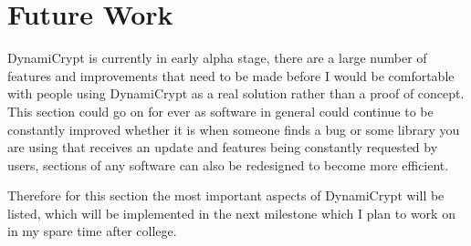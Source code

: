 \section{Future Work}
DynamiCrypt is currently in early alpha stage, there are a large number of features and improvements that need to be made before I would be comfortable with people using DynamiCrypt as a real solution rather than a proof of concept. This section could go on for ever as software in general could continue to be constantly improved whether it is when someone finds a bug or some library you are using that receives an update and features being constantly requested by users, sections of any software can also be redesigned to become more efficient. 

Therefore for this section the most important aspects of DynamiCrypt will be listed, which will be implemented in the next milestone which I plan to work on in my spare time after college.

